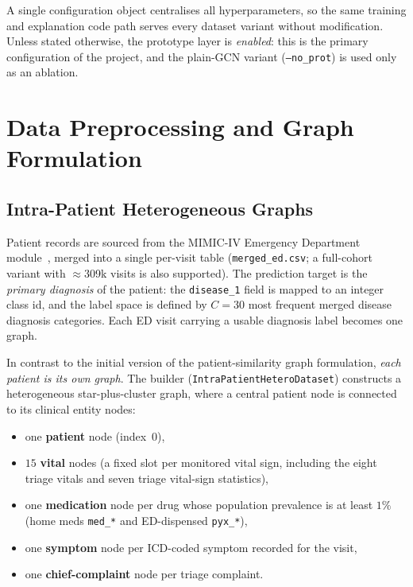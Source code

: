A single configuration object centralises all hyperparameters, so the same
training and explanation code path serves every dataset variant without
modification. Unless stated otherwise, the prototype layer is \emph{enabled}:
this is the primary configuration of the project, and the plain-GCN variant
(\texttt{--no\_prot}) is used only as an ablation.

\section{Data Preprocessing and Graph Formulation}

\subsection{Intra-Patient Heterogeneous Graphs}

Patient records are sourced from the MIMIC-IV Emergency Department
module~\cite{johnson2023mimicived}, merged into a single per-visit table
(\texttt{merged\_ed.csv}; a full-cohort variant with $\approx$309k visits is
also supported). The prediction target is the \emph{primary diagnosis} of the patient: the
\texttt{disease\_1} field is mapped to an integer class id, and the label space is defined by $C = 30$ most frequent merged disease diagnosis categories. Each
ED visit carrying a usable diagnosis label becomes one graph.

In contrast to the initial version of the patient-similarity graph formulation,
\emph{each patient is its own graph}. The builder
(\texttt{IntraPatientHeteroDataset}) constructs a heterogeneous star-plus-cluster
graph, where a central patient node is connected to its clinical entity nodes:

\begin{itemize}
  \item one \textbf{patient} node (index~0),
  \item $15$ \textbf{vital} nodes (a fixed slot per monitored vital sign,
        including the eight triage vitals and seven triage vital-sign
        statistics),
  \item one \textbf{medication} node per drug whose population prevalence is at
        least $1\%$ (home meds \texttt{med\_*} and ED-dispensed
        \texttt{pyx\_*}),
  \item one \textbf{symptom} node per ICD-coded symptom recorded for the visit,
  \item one \textbf{chief-complaint} node per triage complaint.
\end{itemize}

